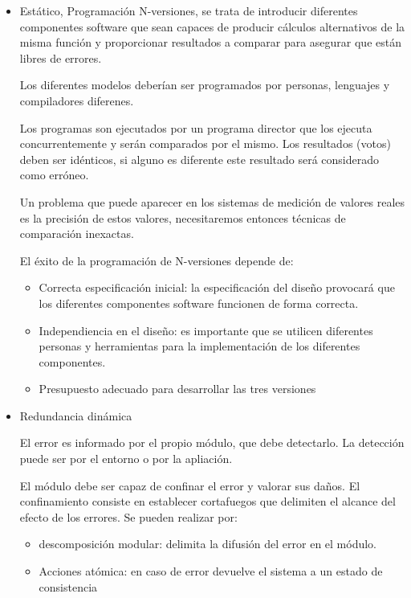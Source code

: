 \begin{itemize}
	\item Estático, Programación N-versiones, se trata de introducir
		diferentes componentes software que sean capaces de producir
		cálculos alternativos de la misma función y proporcionar
		resultados a comparar para asegurar que están libres de errores.

		Los diferentes modelos deberían ser programados por personas,
		lenguajes y compiladores diferenes.
		
		Los programas son ejecutados por un programa director que los
		ejecuta concurrentemente y serán comparados por el mismo. Los
		resultados (votos) deben ser idénticos, si alguno es diferente
		este resultado será considerado como erróneo.

		Un problema que puede aparecer en los sistemas de medición de
		valores reales es la precisión de estos valores, necesitaremos
		entonces técnicas de comparación inexactas.

		El éxito de la programación de N-versiones depende de:

		\begin{itemize}
			\item Correcta especificación inicial: la especificación
				del diseño provocará que los diferentes
				componentes software funcionen de forma
				correcta.
			\item Independiencia en el diseño: es importante que se
				utilicen diferentes personas y herramientas para
				la implementación de los diferentes componentes.
			\item Presupuesto adecuado para desarrollar las tres
				versiones
		\end{itemize}
	\item Redundancia dinámica

		El error es informado por el propio módulo, que debe detectarlo.
		La detección puede ser por el entorno o por la apliación.

		El módulo debe ser capaz de confinar el error y valorar sus
		daños. El confinamiento consiste en establecer cortafuegos que
		delimiten el alcance del efecto de los errores. Se pueden
		realizar por:
		\begin{itemize}
			\item descomposición modular: delimita la difusión del
				error en el módulo.
			\item Acciones atómica: en caso de error devuelve el
				sistema a un estado de consistencia
		\end{itemize}


\end{itemize}
